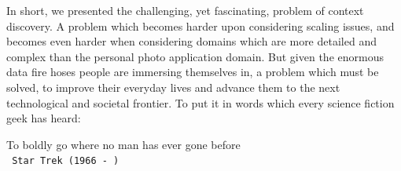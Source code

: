 In short, we presented the challenging, yet fascinating, problem of context discovery. A problem which becomes harder upon considering scaling issues, and becomes even harder when considering domains which are more detailed and complex than the personal photo application domain. But given the enormous data fire hoses people are immersing themselves in, a problem which must be solved, to improve their everyday lives and advance them to the next technological and societal frontier. To put it in words which every science fiction geek has heard:

\centering
To boldly go where no man has ever gone before \\
\setlength{\parindent}{12cm} \texttt{ Star Trek (1966 - ) } 